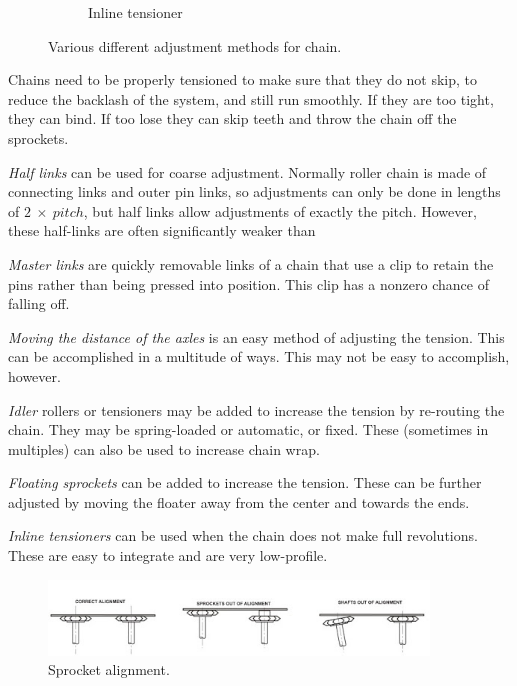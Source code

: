 \begin{figure}[H]
\begin{subfigure}[b]{.32\linewidth}
		\caption{Inline tensioner}
	\end{subfigure}
	
	\caption{Various different adjustment methods for chain.}
\end{figure}

Chains need to be properly tensioned to make sure that they do not skip, to reduce the backlash of the system, and still run smoothly. If they are too tight, they can bind. If too lose they can skip teeth and throw the chain off the sprockets.

\begin{asparaenum}[a)]
	\item \textit{Half links} can be used for coarse adjustment. Normally roller chain is made of connecting links and outer pin links, so adjustments can only be done in lengths of $2 \ \times \ pitch$, but half links allow adjustments of exactly the pitch. However, these half-links are often significantly weaker than 
	\item \textit{Master links} are quickly removable links of a chain that use a clip to retain the pins rather than being pressed into position. This clip has a nonzero chance of falling off.
	\item \textit{Moving the distance of the axles} is an easy method of adjusting the tension. This can be accomplished in a multitude of ways. This may not be easy to accomplish, however.
	\item \textit{Idler} rollers or tensioners may be added to increase the tension by re-routing the chain. They may be spring-loaded or automatic, or fixed. These (sometimes in multiples) can also be used to increase chain wrap.
	\item \textit{Floating sprockets} can be added to increase the tension. These can be further adjusted by moving the floater away from the center and towards the ends.
	\item \textit{Inline tensioners} can be used when the chain does not make full revolutions. These are easy to integrate and are very low-profile.
\end{asparaenum}

\begin{figure}[H]
\includegraphics[width=0.9\textwidth]{imgs/chain_alignment.jpeg}
\caption{Sprocket alignment.}
\end{figure}

